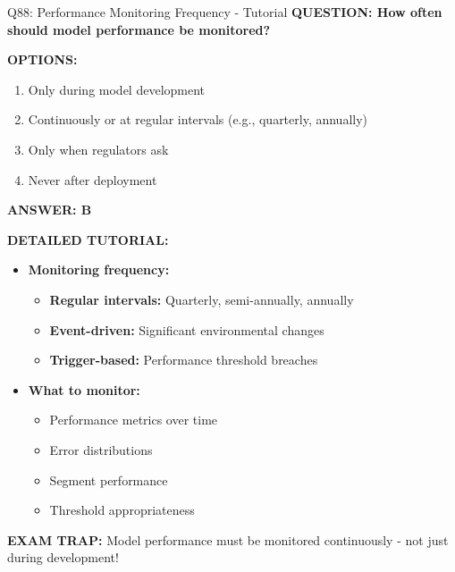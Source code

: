 \documentclass[8pt]{beamer}
\begin{document}
\begin{frame}{Q88: Performance Monitoring Frequency - Tutorial}
	\fontsize{6.5}{7.5}\selectfont
	\textbf{QUESTION: How often should model performance be monitored?}
	
	\vspace{0.1cm}
	\textbf{OPTIONS:}
	\begin{enumerate}
		\item Only during model development
		\item Continuously or at regular intervals (e.g., quarterly, annually)
		\item Only when regulators ask
		\item Never after deployment
	\end{enumerate}
	
	\vspace{0.1cm}
	\textcolor{myblue}{\textbf{ANSWER: B}}
	
	\vspace{0.1cm}
	\textbf{DETAILED TUTORIAL:}
	\begin{itemize}
		\item \textbf{Monitoring frequency:}
		\begin{itemize}
			\item \textbf{Regular intervals:} Quarterly, semi-annually, annually
			\item \textbf{Event-driven:} Significant environmental changes
			\item \textbf{Trigger-based:} Performance threshold breaches
		\end{itemize}
		\item \textbf{What to monitor:}
		\begin{itemize}
			\item Performance metrics over time
			\item Error distributions
			\item Segment performance
			\item Threshold appropriateness
		\end{itemize}
	\end{itemize}
	
	\textcolor{myred}{\textbf{EXAM TRAP:}} Model performance must be \textcolor{myblue}{monitored continuously} - not just during development!
\end{frame}
\end{document}

